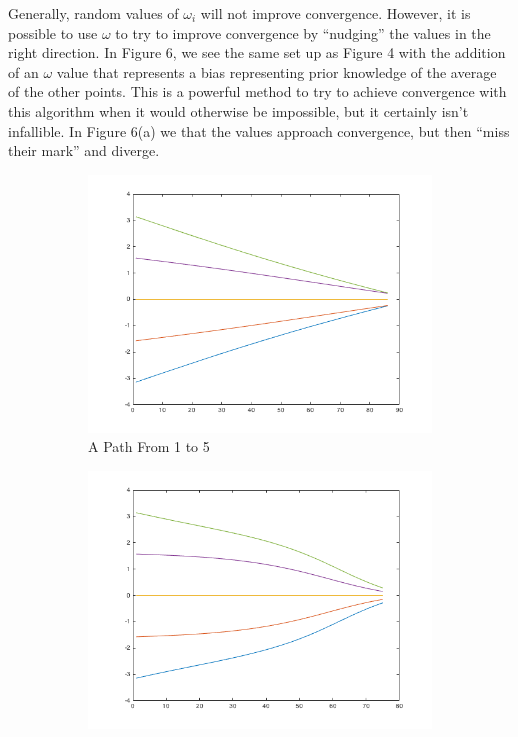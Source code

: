 \documentclass{article}
\begin{document}
Generally, random values of $\omega_i$ will not improve convergence. However, it
is possible to use $\omega$ to try to improve convergence by ``nudging'' the
values in the right direction. In Figure 6, we see the same set up as Figure 4
with the addition of an $\omega$ value that represents a bias representing
prior knowledge of the average of the other points. This is a powerful method to
try to achieve convergence with this algorithm when it would otherwise be
impossible, but it certainly isn't infallible. In Figure 6(a) we that the values
approach convergence, but then ``miss their mark'' and diverge. 
\begin{figure}[h!]
\centering
\caption{Initial Values Between ($-\pi$ to $\pi$)\\
Omega between $(\pi\cdot 0.9,-\pi\cdot 0.9)$\\Convergence Criterion Relaxed}
\begin{subfigure}[t]{0.3\textwidth}
\includegraphics[width=\textwidth]{./pi-om0-9-min-rel.png}
\centering
\caption{A Path From 1 to 5}
\end{subfigure}
\begin{subfigure}[t]{0.3\textwidth}
\centering
\includegraphics[width=\textwidth]{pi-om0-9-max-rel.png}

\end{subfigure}
\end{figure}
\end{document}
